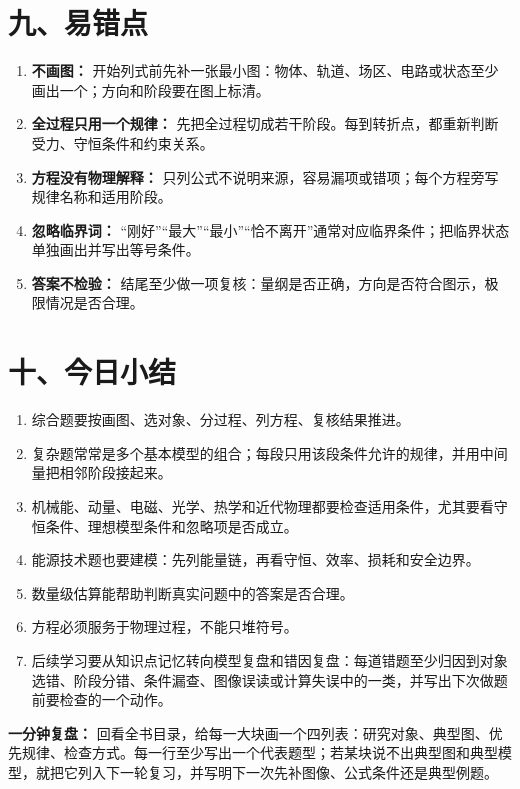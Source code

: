 \section*{九、易错点}
\begin{mistakebox}
\begin{enumerate}
  \item \textbf{不画图：} 开始列式前先补一张最小图：物体、轨道、场区、电路或状态至少画出一个；方向和阶段要在图上标清。
  \item \textbf{全过程只用一个规律：} 先把全过程切成若干阶段。每到转折点，都重新判断受力、守恒条件和约束关系。
  \item \textbf{方程没有物理解释：} 只列公式不说明来源，容易漏项或错项；每个方程旁写规律名称和适用阶段。
  \item \textbf{忽略临界词：} “刚好”“最大”“最小”“恰不离开”通常对应临界条件；把临界状态单独画出并写出等号条件。
  \item \textbf{答案不检验：} 结尾至少做一项复核：量纲是否正确，方向是否符合图示，极限情况是否合理。
\end{enumerate}
\end{mistakebox}

\section*{十、今日小结}
\begin{enumerate}
  \item 综合题要按画图、选对象、分过程、列方程、复核结果推进。
  \item 复杂题常常是多个基本模型的组合；每段只用该段条件允许的规律，并用中间量把相邻阶段接起来。
  \item 机械能、动量、电磁、光学、热学和近代物理都要检查适用条件，尤其要看守恒条件、理想模型条件和忽略项是否成立。
  \item 能源技术题也要建模：先列能量链，再看守恒、效率、损耗和安全边界。
  \item 数量级估算能帮助判断真实问题中的答案是否合理。
  \item 方程必须服务于物理过程，不能只堆符号。
  \item 后续学习要从知识点记忆转向模型复盘和错因复盘：每道错题至少归因到对象选错、阶段分错、条件漏查、图像误读或计算失误中的一类，并写出下次做题前要检查的一个动作。
\end{enumerate}

\textbf{一分钟复盘：} 回看全书目录，给每一大块画一个四列表：研究对象、典型图、优先规律、检查方式。每一行至少写出一个代表题型；若某块说不出典型图和典型模型，就把它列入下一轮复习，并写明下一次先补图像、公式条件还是典型例题。
